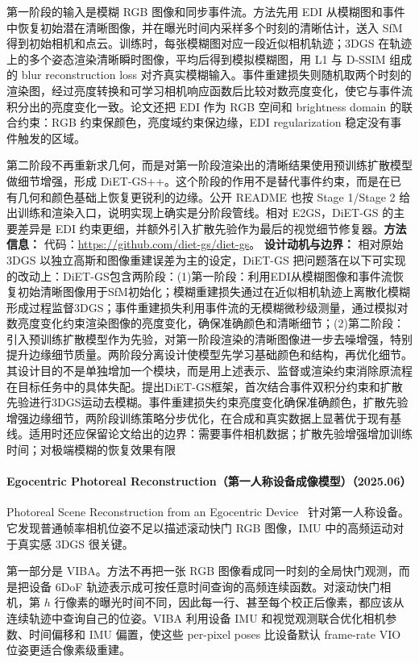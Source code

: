 第一阶段的输入是模糊 RGB 图像和同步事件流。方法先用 EDI 从模糊图和事件中恢复初始潜在清晰图像，并在曝光时间内采样多个时刻的清晰估计，送入 SfM 得到初始相机和点云。训练时，每张模糊图对应一段近似相机轨迹；3DGS 在轨迹上的多个姿态渲染清晰瞬时图像，平均后得到模拟模糊图，用 L1 与 D-SSIM 组成的 blur reconstruction loss 对齐真实模糊输入。事件重建损失则随机取两个时刻的渲染图，经过亮度转换和可学习相机响应函数后比较对数亮度变化，使它与事件流积分出的亮度变化一致。论文还把 EDI 作为 RGB 空间和 brightness domain 的联合约束：RGB 约束保颜色，亮度域约束保边缘，EDI regularization 稳定没有事件触发的区域。

第二阶段不再重新求几何，而是对第一阶段渲染出的清晰结果使用预训练扩散模型做细节增强，形成 DiET-GS++。这个阶段的作用不是替代事件约束，而是在已有几何和颜色基础上恢复更锐利的边缘。公开 README 也按 Stage 1/Stage 2 给出训练和渲染入口，说明实现上确实是分阶段管线。相对 E2GS，DiET-GS 的主要差异是 EDI 约束更细，并额外引入扩散先验作为最后的视觉细节修复器。\textbf{方法信息：} 代码：\url{https://github.com/diet-gs/diet-gs}。
\textbf{设计动机与边界：} 相对原始 3DGS 以独立高斯和图像重建误差为主的设定，DiET-GS 把问题落在以下可实现的改动上：DiET-GS包含两阶段：(1)第一阶段：利用EDI从模糊图像和事件流恢复初始清晰图像用于SfM初始化；模糊重建损失通过在近似相机轨迹上离散化模糊形成过程监督3DGS；事件重建损失利用事件流的无模糊微秒级测量，通过模拟对数亮度变化约束渲染图像的亮度变化，确保准确颜色和清晰细节；(2)第二阶段：引入预训练扩散模型作为先验，对第一阶段渲染的清晰图像进一步去噪增强，特别提升边缘细节质量。两阶段分离设计使模型先学习基础颜色和结构，再优化细节。其设计目的不是单独增加一个模块，而是用上述表示、监督或渲染约束消除原流程在目标任务中的具体失配。提出DiET-GS框架，首次结合事件双积分约束和扩散先验进行3DGS运动去模糊。事件重建损失约束亮度变化确保准确颜色，扩散先验增强边缘细节，两阶段训练策略分步优化，在合成和真实数据上显著优于现有基线。适用时还应保留论文给出的边界：需要事件相机数据；扩散先验增强增加训练时间；对极端模糊的恢复效果有限
\paragraph{Egocentric Photoreal Reconstruction（第一人称设备成像模型）（2025.06）}
Photoreal Scene Reconstruction from an Egocentric Device~\cite{2506_04444} 针对第一人称设备。它发现普通帧率相机位姿不足以描述滚动快门 RGB 图像，IMU 中的高频运动对于真实感 3DGS 很关键。

第一部分是 VIBA。方法不再把一张 RGB 图像看成同一时刻的全局快门观测，而是把设备 6DoF 轨迹表示成可按任意时间查询的高频连续函数。对滚动快门相机，第 $h$ 行像素的曝光时间不同，因此每一行、甚至每个校正后像素，都应该从连续轨迹中查询自己的位姿。VIBA 利用设备 IMU 和视觉观测联合优化相机参数、时间偏移和 IMU 偏置，使这些 per-pixel poses 比设备默认 frame-rate VIO 位姿更适合像素级重建。

